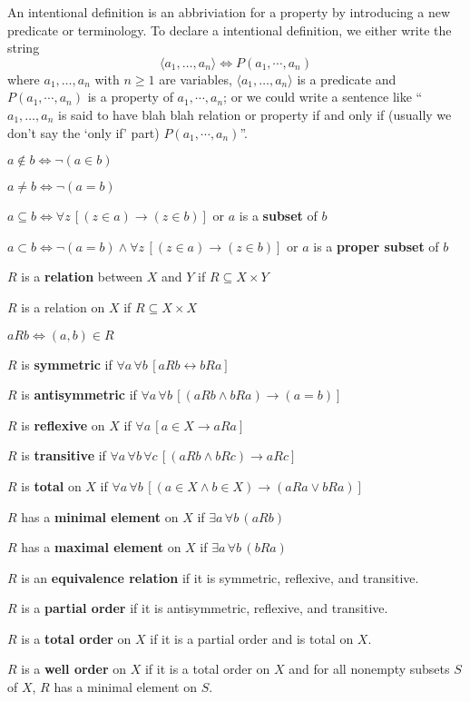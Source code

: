 \documentclass[11pt]{book}
\newcommand{\env}[2]{\begin{#1}#2\end{#1}}
\begin{document}
\iffalse
\begin{definition}[Arabic Numerals]Define the notational symbols $0,1,2,3,4,5,6,7,8,9$ as
\[\begin{aligned}
0&:=\emptyset\\
1&:=\{0\}\\
2&:=\{0,1\}\\
3&:=\{0,1,2\}\\
4&:=\{0,1,2,3\}\\
5&:=\{0,1,2,3,4\}\\
6&:=\{0,1,2,3,4,5\}\\
7&:=\{0,1,2,3,4,5,6\}\\
8&:=\{0,1,2,3,4,5,6,7\}\\
9&:=\{0,1,2,3,4,5,6,7,8\}\\
\end{aligned}\]
\end{definition}\fi

An intentional definition is an abbriviation for a property by introducing a new predicate or terminology. To declare a intentional definition, we either write the string
\[\langle a_1,\dots,a_n\rangle\Longleftrightarrow P(a_1,\cdots,a_n)\]
where $a_1,\dots,a_n$ with $n\ge 1$ are variables, $\langle a_1,\dots,a_n\rangle$ is a predicate and $P(a_1,\cdots,a_n)$ is a property of $a_1,\cdots,a_n$; or we could write a sentence like ``$a_1,\dots,a_n$ is said to have blah blah relation or property if and only if (usually we don't say the `only if' part) $P(a_1,\cdots,a_n)$''. 
\env{definition}{$a\not\in b\Longleftrightarrow \neg (a\in b)$}
\env{definition}{$a\ne b\Longleftrightarrow \neg (a=b)$}
\env{definition}{$a\subseteq b\Longleftrightarrow \forall z\,[(z\in a)\rightarrow (z\in b)]$ or $a$ is a \textbf{subset} of $b$}
\env{definition}{$a\subset b\Longleftrightarrow \neg(a=b)\land\forall z\,[(z\in a)\rightarrow (z\in b)]$ or $a$ is a \textbf{proper subset} of $b$}
\env{definition}{$R$ is a \textbf{relation} between $X$ and $Y$ if $R\subseteq X\times Y$}
\env{definition}{$R$ is a relation on $X$ if $R\subseteq X\times X$}
\env{definition}{$aRb\Longleftrightarrow (a,b)\in R$}
\env{definition}{$R$ is \textbf{symmetric} if $\forall a\,\forall b\, [aRb\leftrightarrow bR a]$}
\env{definition}{$R$ is \textbf{antisymmetric} if $\forall a\,\forall b\,[(aRb\land bRa)\rightarrow (a=b)]$}
\env{definition}{$R$ is \textbf{reflexive} on $X$ if $\forall a\,[a\in X\rightarrow aRa]$}
\env{definition}{$R$ is \textbf{transitive} if $\forall a\,\forall b\,\forall c\, [(aRb\land bRc)\rightarrow aRc]$}
\env{definition}{$R$ is \textbf{total} on $X$ if $\forall a\,\forall b\,[(a\in X\land b\in X)\rightarrow (aRa\lor bRa)]$}
\env{definition}{$R$ has a \textbf{minimal element} on $X$ if $\exists a\,\forall b\, (aRb)$}
\env{definition}{$R$ has a \textbf{maximal element} on $X$ if $\exists a\,\forall b\, (bRa)$}
\env{definition}{$R$ is an \textbf{equivalence relation} if it is symmetric, reflexive, and transitive.}
\env{definition}{$R$ is a \textbf{partial order} if it is antisymmetric, reflexive, and transitive.}
\env{definition}{$R$ is a \textbf{total order} on $X$ if it is a partial order and is total on $X$.}
\env{definition}{$R$ is a \textbf{well order} on $X$ if it is a total order on $X$ and for all nonempty subsets $S$ of $X$, $R$ has a minimal element on $S$.}
\end{document}
